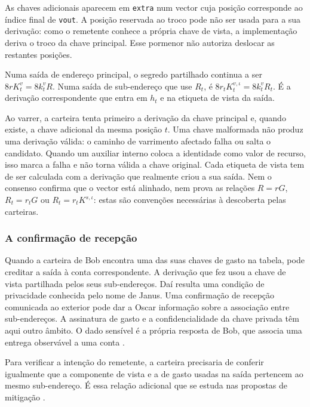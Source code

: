 As chaves adicionais aparecem em \texttt{extra} num vector cuja posição
corresponde ao índice final de \texttt{vout}. A posição reservada ao troco
pode não ser usada para a sua derivação: como o remetente conhece a própria
chave de vista, a implementação deriva o troco da chave principal. Esse
pormenor não autoriza deslocar as restantes posições.

Numa saída de endereço principal, o segredo partilhado continua a ser
\(8rK_t^v=8k_t^vR\). Numa saída de sub-endereço que use \(R_t\), é
\(8r_tK_t^{v,\iota}=8k_t^vR_t\). É a derivação correspondente que entra em
\(h_t\) e na etiqueta de vista da saída.

Ao varrer, a carteira tenta primeiro a derivação da chave principal e, quando
existe, a chave adicional da mesma posição \(t\). Uma chave malformada não
produz uma derivação válida: o caminho de varrimento afectado falha ou salta o
candidato. Quando um auxiliar interno coloca a identidade como valor de
recurso, isso marca a falha e não torna válida a chave original. Cada etiqueta
de vista tem de ser calculada com a derivação que realmente criou a sua saída.
Nem o consenso confirma que o vector está alinhado, nem prova as relações
\(R=rG\), \(R_t=r_tG\) ou \(R_t=r_tK^{s,\iota}\): estas são convenções
necessárias à descoberta pelas carteiras.



\subsubsection*{A confirmação de recepção}

Quando a carteira de Bob encontra uma das suas chaves de gasto na
tabela, pode creditar a saída à conta correspondente. A derivação que
fez usou a chave de vista partilhada pelos seus sub-endereços. Daí
resulta uma condição de privacidade conhecida pelo nome de Janus.
Uma confirmação de recepção comunicada ao exterior pode dar a Oscar
informação sobre a associação entre sub-endereços. A assinatura de
gasto e a confidencialidade da chave privada têm aqui outro âmbito.
O dado sensível é a própria resposta de Bob, que associa uma entrega
observável a uma conta \cite{janus-attack}.

Para verificar a intenção do remetente, a carteira precisaria de
conferir igualmente que a componente de vista e a de gasto
usadas na saída pertencem ao mesmo sub-endereço. É essa relação
adicional que se estuda nas propostas de mitigação
\cite{janus-mitigation-issue-62}.

